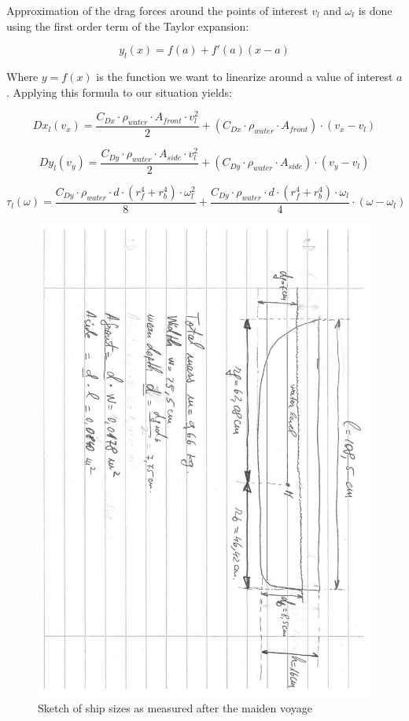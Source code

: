 Approximation of the drag forces around the points of interest $v_{l} $ and $\omega_{l}$ is done using the first order term of the Taylor expansion:

\[ y_{l}(x) = f(a) + f'(a)(x-a) \]

Where $y = f(x)$ is the function we want to linearize around a value of interest $a$. Applying this formula to our situation yields:

\[ Dx_{l}(v_{x}) = \frac{C_{Dx}\cdot\rho_{water}\cdot A_{front}\cdot v_{l}^{2}}{2} + (C_{Dx}\cdot\rho_{water}\cdot A_{front})\cdot (v_{x}-v_{l}) \]

\[ Dy_{l}(v_{y}) = \frac{C_{Dy}\cdot\rho_{water}\cdot A_{side}\cdot v_{l}^{2}}{2} + (C_{Dy}\cdot\rho_{water}\cdot A_{side})\cdot (v_{y}-v_{l}) \]

\[ \tau_{l}(\omega) = \frac{C_{Dy} \cdot \rho_{water} \cdot d \cdot (r_{f}^{4} + r_{b}^{4}) \cdot \omega_{l}^{2}}{8} + \frac{C_{Dy} \cdot \rho_{water} \cdot d \cdot (r_{f}^{4} + r_{b}^{4}) \cdot \omega_{l}}{4} \cdot (\omega - \omega_{l}) \] 

\begin{figure}[htbp]
	\centering
	\includegraphics[width=\textwidth, trim=1.8cm 0cm 0cm 2cm, clip = true, angle = 90, width=\textwidth]{img/ship_sizes}
	\caption{Sketch of ship sizes as measured after the maiden voyage}
	\label{fig:ship_sizes}
\end{figure}

